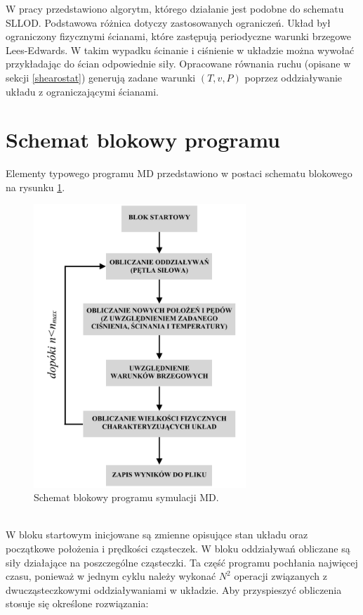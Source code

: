 \documentclass[12pt,a4paper,openright]{report} %
\begin{document}
W pracy przedstawiono algorytm, którego działanie jest podobne do schematu SLLOD. Podstawowa różnica dotyczy zastosowanych ograniczeń. Układ był ograniczony fizycznymi ścianami, które zastępują periodyczne warunki brzegowe Lees-Edwards. W takim wypadku ścinanie i ciśnienie w układzie można wywołać przykładając do ścian odpowiednie siły. Opracowane równania ruchu (opisane w sekcji \ref{shearostat}) generują zadane warunki $(T, v, P)$ poprzez oddziaływanie układu z ograniczającymi ścianami. 

\section{Schemat blokowy programu}
%
Elementy typowego programu MD przedstawiono w postaci schematu blokowego na rysunku \ref{schemat_blokowy}. 
\begin{figure}[h]
\centering
\includegraphics[width=80mm]{rysunki/schemat_blokowy.pdf}
\caption{Schemat blokowy programu symulacji MD.}
\label{schemat_blokowy}
\end{figure}
\\
W bloku startowym inicjowane są zmienne opisujące stan układu oraz początkowe położenia i prędkości cząsteczek. W bloku oddziaływań obliczane są siły działające na poszczególne cząsteczki. Ta część programu pochłania najwięcej czasu, ponieważ w jednym cyklu należy wykonać $N^2$ operacji związanych z dwucząsteczkowymi oddziaływaniami w układzie. Aby przyspieszyć obliczenia stosuje się określone rozwiązania:
\end{document}
